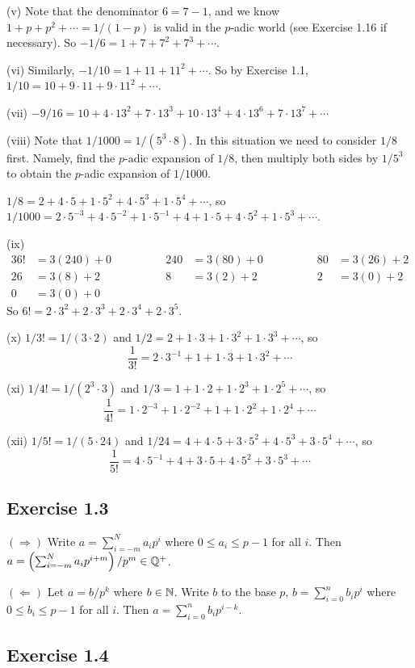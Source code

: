 \documentclass[../Koblitz.tex]{subfiles}
\begin{document}
(v) Note that the denominator $6=7-1$, and we know $1+p+p^2+\cdots=1/(1-p)$ is valid in the $p$-adic world (see Exercise 1.16 if necessary). So $-1/6=1+7+7^2+7^3+\cdots$.

(vi) Similarly, $-1/10=1+11+11^2+\cdots$. So by Exercise 1.1, $1/10=10+9\cdot11+9\cdot11^2+\cdots$.

(vii) $-9/16=10+4\cdot13^2+7\cdot13^3+10\cdot13^4+4\cdot13^6+7\cdot13^7+\cdots$

(viii) Note that $1/1000=1/(5^3\cdot8)$. In this situation we need to consider $1/8$ first. Namely, find the $p$-adic expansion of $1/8$, then multiply both sides by $1/5^3$ to obtain the $p$-adic expansion of $1/1000$.

$1/8=2+4\cdot5+1\cdot5^2+4\cdot5^3+1\cdot5^4+\cdots$, so $1/1000=2\cdot5^{-3}+4\cdot5^{-2}+1\cdot5^{-1}+4+1\cdot5+4\cdot5^2+1\cdot5^3+\cdots$.

(ix) \begin{alignat*}{3}
    6!&=3(240)+0 &\qquad\qquad 240&=3(80)+0 &\qquad\qquad 80&=3(26)+2 \\
    26&=3(8)+2 &\qquad \qquad 8&=3(2)+2 &\qquad\qquad 2&=3(0)+2 \\
    0&=3(0)+0
\end{alignat*}
So $6!=2\cdot3^2+2\cdot3^3+2\cdot3^4+2\cdot3^5$.

(x) $1/3!=1/(3\cdot2)$ and $1/2=2+1\cdot3+1\cdot3^2+1\cdot3^3+\cdots$, so $$\frac{1}{3!}=2\cdot3^{-1}+1+1\cdot3+1\cdot3^2+\cdots$$

(xi) $1/4!=1/(2^3\cdot3)$ and $1/3=1+1\cdot2+1\cdot2^3+1\cdot2^5+\cdots$, so $$\frac{1}{4!}=1\cdot2^{-3}+1\cdot2^{-2}+1+1\cdot2^2+1\cdot2^4+\cdots$$

(xii) $1/5!=1/(5\cdot24)$ and $1/24=4+4\cdot5+3\cdot5^2+4\cdot5^3+3\cdot5^4+\cdots$, so $$\frac{1}{5!}=4\cdot5^{-1}+4+3\cdot5+4\cdot5^2+3\cdot5^3+\cdots$$

\subsection*{Exercise 1.3}

$(\Rightarrow)$ Write $a=\sum_{i=-m}^N a_ip^i$ where $0\leq a_i\leq p-1$ for all $i$. Then $a=\left(\sum_{i=-m}^N a_ip^{i+m}\right)/p^m\in\mathbb{Q}^+$.

$(\Leftarrow)$ Let $a=b/p^k$ where $b\in\mathbb{N}$. Write $b$ to the base $p$, $b=\sum_{i=0}^n b_ip^i$ where $0\leq b_i\leq p-1$ for all $i$. Then $a=\sum_{i=0}^n b_ip^{i-k}$.

\subsection*{Exercise 1.4}
\end{document}

